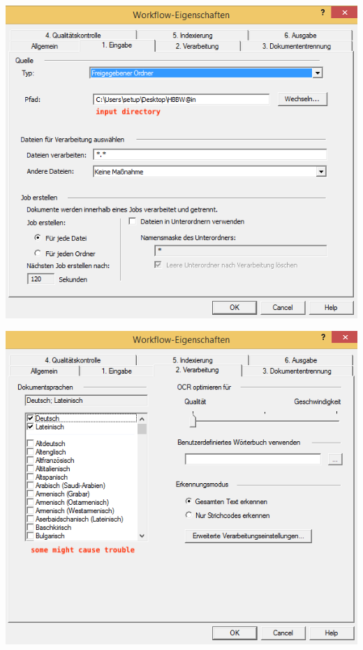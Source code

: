 \begin{minipage}{0.4\textwidth} 
\begin{center}
\includegraphics[scale=0.42]{1_eingabe.png}
\end{center}
\end{minipage}
\begin{minipage}{0.4\textwidth}
\begin{center}
\includegraphics[scale=0.42]{2_verarbeitung.png}
\end{center}
\end{minipage}


